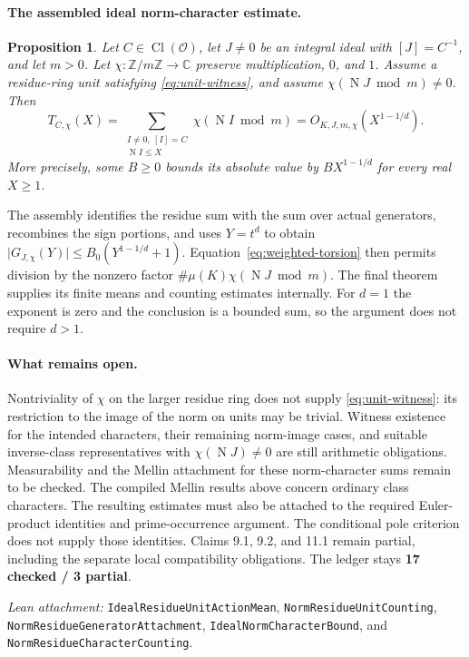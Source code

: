 \documentclass[11pt]{article}
\newcommand{\OO}{\mathcal O}
\newcommand{\ZZ}{\mathbb Z}
\newcommand{\CC}{\mathbb C}
\newcommand{\Cl}{\operatorname{Cl}}
\newcommand{\Nm}{\operatorname N}
\newcommand{\absn}[1]{\lvert #1\rvert}
\newtheorem{proposition}{Proposition}
\begin{document}
\paragraph{The assembled ideal norm-character estimate.}
\begin{proposition}\label{prop:norm-character}
Let $C\in\Cl(\OO)$, let $J\ne0$ be an integral ideal with $[J]=C^{-1}$,
and let $m>0$. Let $\chi:\ZZ/m\ZZ\to\CC$ preserve multiplication,
$0$, and $1$. Assume a residue-ring unit satisfying
\eqref{eq:unit-witness}, and assume
$\chi(\Nm J\bmod m)\ne0$. Then
\[
 T_{C,\chi}(X)
 =\sum_{\substack{I\ne0,\ [I]=C\\\Nm I\leq X}}
       \chi(\Nm I\bmod m)
 =O_{K,J,m,\chi}(X^{1-1/d}).
\]
More precisely, some $B\geq0$ bounds its absolute value by
$BX^{1-1/d}$ for every real $X\geq1$.
\end{proposition}

The assembly identifies the residue sum with the sum over actual generators,
recombines the sign portions, and uses $Y=t^d$ to obtain
$\absn{G_{J,\chi}(Y)}\leq B_0(Y^{1-1/d}+1)$.
Equation~\eqref{eq:weighted-torsion} then permits division by the nonzero
factor $\#\mu(K)\chi(\Nm J\bmod m)$.
The final theorem supplies its finite means and counting estimates internally.
For $d=1$ the exponent is zero and the conclusion is a bounded sum, so the
argument does not require $d>1$.

\paragraph{What remains open.}
Nontriviality of $\chi$ on the larger residue ring does not supply
\eqref{eq:unit-witness}: its restriction to the image of the norm on units
may be trivial. Witness existence for the intended characters, their
remaining norm-image cases, and suitable inverse-class representatives with
$\chi(\Nm J)\ne0$ are still arithmetic obligations.
Measurability and the Mellin attachment for these norm-character sums remain
to be checked. The compiled Mellin results above concern ordinary class characters.
The resulting estimates must also be attached to the required Euler-product
identities and prime-occurrence argument. The conditional pole criterion
does not supply those identities. Claims 9.1, 9.2, and 11.1 remain partial,
including the separate local compatibility obligations. The ledger stays
\textbf{17 checked / 3 partial}.

\smallskip
\noindent\emph{Lean attachment:}
\texttt{IdealResidueUnitActionMean}, \texttt{NormResidueUnitCounting},
\texttt{NormResidueGeneratorAttachment}, \texttt{IdealNormCharacterBound},
and \texttt{NormResidueCharacterCounting}.
\end{document}
